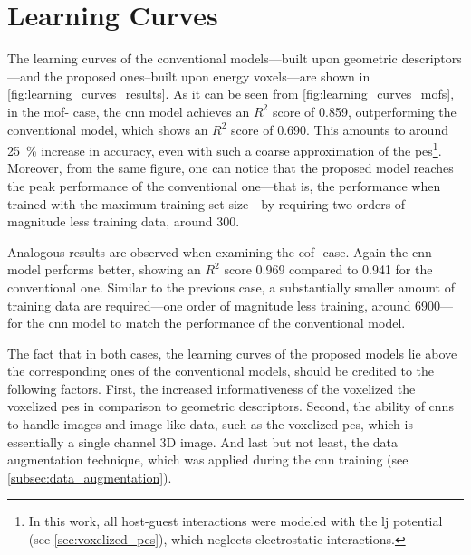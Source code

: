 \section{Learning Curves}

The learning curves of the conventional models---built
upon geometric descriptors---and the proposed ones--built upon energy
voxels---are shown in \Figure{} \ref{fig:learning_curves_results}. As it can be
seen from \Figure{} \ref{fig:learning_curves_mofs}, in the \gls{mof}- case,
the \gls{cnn} model achieves an $R^2$ score of \num{0.859}, outperforming the
conventional model, which shows an $R^2$ score of \num{0.690}. This amounts to
around \SI{25}{\percent} increase in accuracy, even with such a coarse
approximation of the \gls{pes}\footnote{In this work, all host-guest
interactions were modeled with the \gls{lj} potential (see \Section{}
\ref{sec:voxelized_pes}), which neglects electrostatic interactions.}. Moreover,
from the same figure, one can notice that the proposed model reaches the peak
performance of the conventional one---that is, the performance when trained with
the maximum training set size---by requiring two orders of magnitude less
training data, around \num{300}.

Analogous results are observed when examining the \gls{cof}- case. Again
the \gls{cnn} model performs better, showing an $R^2$ score \num{0.969} compared
to \num{0.941} for the conventional one. Similar to the previous case, a
substantially smaller amount of training data are required---one order of
magnitude less training, around \num{6900}---for the \gls{cnn} model to match
the performance of the conventional model.

The fact that in both cases, the learning curves of the proposed models lie
above the corresponding ones of the conventional models, should be credited to
the following factors. First, the increased informativeness of the voxelized the
voxelized \gls{pes} in comparison to geometric descriptors. Second, the ability
of \glspl{cnn} to handle images and image-like data, such
as the voxelized \gls{pes}, which is essentially a single channel 3D image. And
last but not least, the data augmentation technique,
which was applied during the \gls{cnn} training (see \Section{}
\ref{subsec:data_augmentation}).

